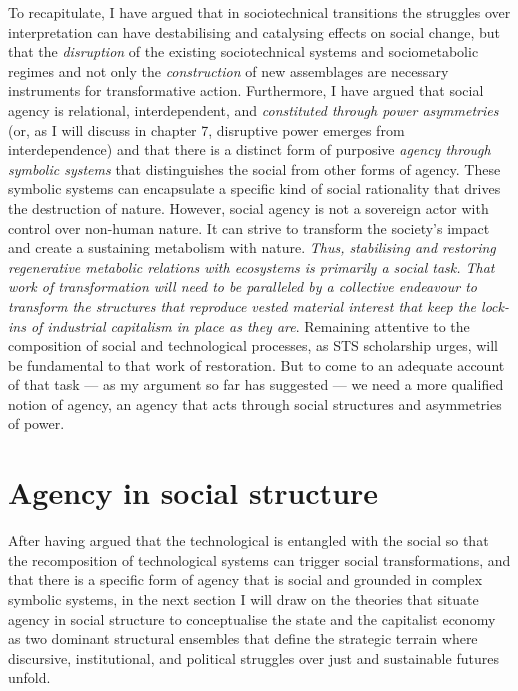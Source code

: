 \documentclass[a4paper, nobind]{templates/ociamthesis}
\begin{document}
To recapitulate, I have argued that in sociotechnical transitions the struggles over interpretation can have destabilising and catalysing effects on social change, but that the \emph{disruption} of the existing sociotechnical systems and sociometabolic regimes and not only the \emph{construction} of new assemblages are necessary instruments for transformative action. Furthermore, I have argued that social agency is relational, interdependent, and \emph{constituted through power asymmetries} (or, as I will discuss in chapter 7, disruptive power emerges from interdependence) and that there is a distinct form of purposive \emph{agency through symbolic systems} that distinguishes the social from other forms of agency. These symbolic systems can encapsulate a specific kind of social rationality that drives the destruction of nature. However, social agency is not a sovereign actor with control over non-human nature. It can strive to transform the society's impact and create a sustaining metabolism with nature. \emph{Thus, stabilising and restoring regenerative metabolic relations with ecosystems is primarily a social task. That work of transformation will need to be paralleled by a collective endeavour to transform the structures that reproduce vested material interest that keep the lock-ins of industrial capitalism in place as they are}. Remaining attentive to the composition of social and technological processes, as STS scholarship urges, will be fundamental to that work of restoration. But to come to an adequate account of that task --- as my argument so far has suggested --- we need a more qualified notion of agency, an agency that acts through social structures and asymmetries of power.

\hypertarget{agency-in-social-structure}{%
\section{Agency in social structure}\label{agency-in-social-structure}}

After having argued that the technological is entangled with the social so that the recomposition of technological systems can trigger social transformations, and that there is a specific form of agency that is social and grounded in complex symbolic systems, in the next section I will draw on the theories that situate agency in social structure to conceptualise the state and the capitalist economy as two dominant structural ensembles that define the strategic terrain where discursive, institutional, and political struggles over just and sustainable futures unfold.
\end{document}
